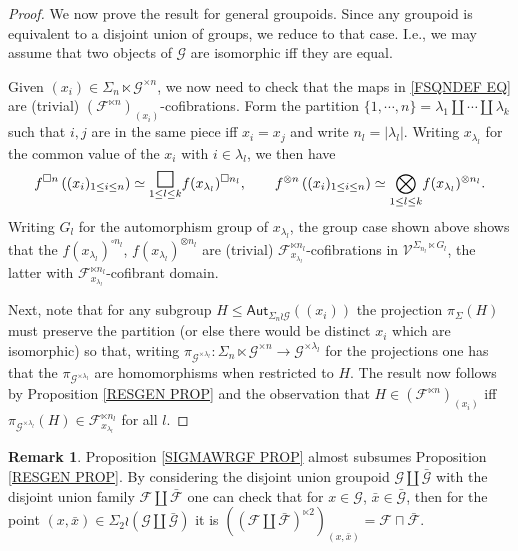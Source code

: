 \documentclass[a4paper,10pt
,draft
]{article}%
\numberwithin{equation}{section}
\numberwithin{figure}{section}
\theoremstyle{definition} %
\newtheorem{remark}[equation]{Remark}%
\newcommand{\F}{\ensuremath{\mathcal F}}
\newcommand{\V}{\ensuremath{\mathcal V}}
\newcommand{\G}{\ensuremath{\mathcal G}}
\newcommand{\1}{\ensuremath{\mathbbm 1}}%
\begin{document}
\begin{proof}
We now prove the result for general groupoids.
Since any groupoid is equivalent to a disjoint union of groups, 
we reduce to that case. I.e., we may assume that two objects of $\G$ are isomorphic iff they are equal.

Given $(x_i) \in \Sigma_n \ltimes \G^{\times n}$,
we now need to check that the maps in \eqref{FSQNDEF EQ}
are (trivial) $\left(\F^{\ltimes n}\right)_{(x_i)}$-cofibrations.
Form the partition 
$\{1,\cdots,n\} = \lambda_1 \amalg \cdots \amalg \lambda_k$
such that $i,j$ are in the same piece iff $x_i=x_j$ and write
$n_l = |\lambda_l|$.
Writing $x_{\lambda_l}$ for the common value of the $x_i$ with $i\in \lambda_l$, we then have
\[
f^{\square n}\left((x_i)_{1\leq i \leq n }\right)
\simeq
\underset{1\leq l \leq k}{\mathlarger{\mathlarger{\mathlarger{\square}}}} f(x_{\lambda_l})^{\square n_l},
\qquad
f^{\otimes n}\left((x_i)_{1\leq i \leq n }\right)
\simeq
\underset{1\leq l \leq k}{\bigotimes} f(x_{\lambda_l})^{\otimes n_l}.
\]
Writing $G_l$ for the automorphism group of $x_{\lambda_l}$,
the group case shown above shows that the
$f(x_{\lambda_l})^{\square n_l}$,
$f(x_{\lambda_l})^{\otimes n_l}$
are (trivial) $\F_{x_{\lambda_l}}^{\ltimes n_l}$-cofibrations
in $\V^{\Sigma_{n_l}\ltimes G_l}$,
the latter with 
$\F_{x_{\lambda_l}}^{\ltimes n_l}$-cofibrant domain.

Next, note that for any subgroup
$H \leq \mathsf{Aut}_{\Sigma_n \wr \G}((x_i))$ the projection 
$\pi_{\Sigma}(H)$ must preserve the partition 
(or else there would be distinct $x_i$ which are isomorphic) 
so that, writing 
$\pi_{\G^{\times \lambda_l}} \colon
\Sigma_n \ltimes \G^{\times n} \to \G^{\times \lambda_l}$
for the projections one has that the 
$\pi_{\G^{\times \lambda_l}}$ are homomorphisms when restricted to $H$. The result now follows by Proposition \ref{RESGEN PROP}
and the observation that
$H \in \left(\F^{\ltimes n}\right)_{(x_i)}$
iff
$\pi_{\G^{\times \lambda_l}}(H) \in \F_{x_{\lambda_l}}^{\ltimes n_l}$
for all $l$.
\end{proof}


\begin{remark}
Proposition \ref{SIGMAWRGF PROP} almost subsumes Proposition \ref{RESGEN PROP}. By considering the disjoint union groupoid 
$\G \amalg \bar{\G}$
with the disjoint union family 
$\F \amalg \bar{\F}$
one can check that for
$x \in \G$, $\bar{x} \in \bar{\G}$,
then for the point $(x,\bar{x}) \in \Sigma_2 \wr (\G \amalg \bar{\G})$
it is
$\left(\left(\F \amalg \bar{\F}\right)^{\ltimes 2}\right)_{(x,\bar{x})} = \F \sqcap \bar{\F}$.
\end{remark}
\end{document}
